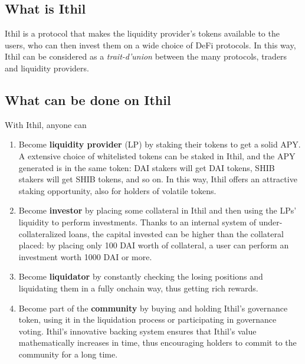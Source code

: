 \documentclass[a4paper,10 pt]{article}
\theoremstyle{definition}
\begin{document}
\subsection{What is Ithil}
Ithil is a protocol that makes the liquidity provider's tokens available to the users, who can then invest them on a wide choice of DeFi protocols. In this way, Ithil can be considered as a {\it trait-d'union} between the many protocols, traders and liquidity providers.

\subsection{What can be done on Ithil}
With Ithil, anyone can
\begin{enumerate}
\item Become {\bf liquidity provider} (LP) by staking their tokens to get a solid APY. A extensive choice of whitelisted tokens can be staked in Ithil, and the APY generated is in the same token: DAI stakers will get DAI tokens, SHIB stakers will get SHIB tokens, and so on. In this way, Ithil offers an attractive staking opportunity, also for holders of volatile tokens.
\item Become {\bf investor} by placing some collateral in Ithil and then using the LPs' liquidity to perform investments. Thanks to an internal system of under-collateralized loans, the capital invested can be higher than the collateral placed: by placing only 100 DAI worth of collateral, a user can perform an investment worth 1000 DAI or more.
\item Become {\bf liquidator} by constantly checking the losing positions and liquidating them in a fully onchain way, thus getting rich rewards.
\item Become part of the {\bf community} by buying and holding Ithil's governance token, using it in the liquidation process or participating in governance voting. Ithil's innovative backing system ensures that Ithil's value mathematically increases in time, thus encouraging holders to commit to the community for a long time.
\end{enumerate}
\end{document}
